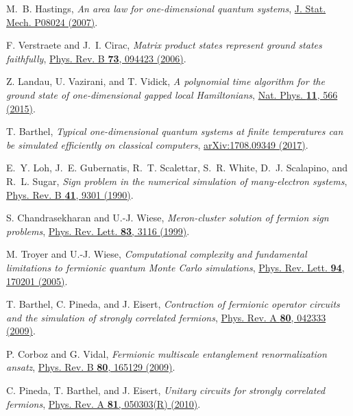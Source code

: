 \documentclass[english,11pt,aps,pra,onecolumn,tightenlines,groupedaddress,superscriptaddress,notitlepage,floatfix,fleqn]{revtex4-1}
\begin{document}
\begin{thebibliography}{10}
M.~B. Hastings, {\em An area law for one-dimensional quantum systems},
  \href{https://doi.org/10.1088/1742-5468/2007/08/P08024} {J. Stat. Mech.
  P08024  (2007)}.

F. Verstraete and J.~I. Cirac, {\em Matrix product states represent ground
  states faithfully}, \href{https://doi.org/10.1103/PhysRevB.73.094423} {Phys.
  Rev. B {\bf 73},  094423  (2006)}.

Z. Landau, U. Vazirani, and T. Vidick, {\em A polynomial time algorithm for the
  ground state of one-dimensional gapped local Hamiltonians},
  \href{https://doi.org/10.1038/nphys3345} {Nat. Phys. {\bf 11},  566  (2015)}.

T. Barthel, {\em Typical one-dimensional quantum systems at finite temperatures
  can be simulated efficiently on classical computers},
  \href{http://arxiv.org/abs/1708.09349} {arXiv:1708.09349  (2017)}.

E.~Y. Loh, J.~E. Gubernatis, R.~T. Scalettar, S.~R. White, D.~J. Scalapino, and
  R.~L. Sugar, {\em Sign problem in the numerical simulation of many-electron
  systems}, \href{https://doi.org/10.1103/PhysRevB.41.9301} {Phys. Rev. B {\bf
  41},  9301  (1990)}.

S. Chandrasekharan and U.-J. Wiese, {\em Meron-cluster solution of fermion sign
  problems}, \href{https://doi.org/10.1103/PhysRevLett.83.3116} {Phys. Rev.
  Lett. {\bf 83},  3116  (1999)}.

M. Troyer and U.-J. Wiese, {\em Computational complexity and fundamental
  limitations to fermionic quantum Monte Carlo simulations},
  \href{https://doi.org/10.1103/PhysRevLett.94.170201} {Phys. Rev. Lett. {\bf
  94},  170201  (2005)}.

T. Barthel, C. Pineda, and J. Eisert, {\em Contraction of fermionic operator
  circuits and the simulation of strongly correlated fermions},
  \href{https://doi.org/10.1103/PhysRevA.80.042333} {Phys. Rev. A {\bf 80},
  042333  (2009)}.

P. Corboz and G. Vidal, {\em Fermionic multiscale entanglement renormalization
  ansatz}, \href{https://doi.org/10.1103/PhysRevB.80.165129} {Phys. Rev. B {\bf
  80},  165129  (2009)}.

C. Pineda, T. Barthel, and J. Eisert, {\em Unitary circuits for strongly
  correlated fermions}, \href{https://doi.org/10.1103/PhysRevA.81.050303}
  {Phys. Rev. A {\bf 81},  050303(R)  (2010)}.


\end{thebibliography}
\end{document}
